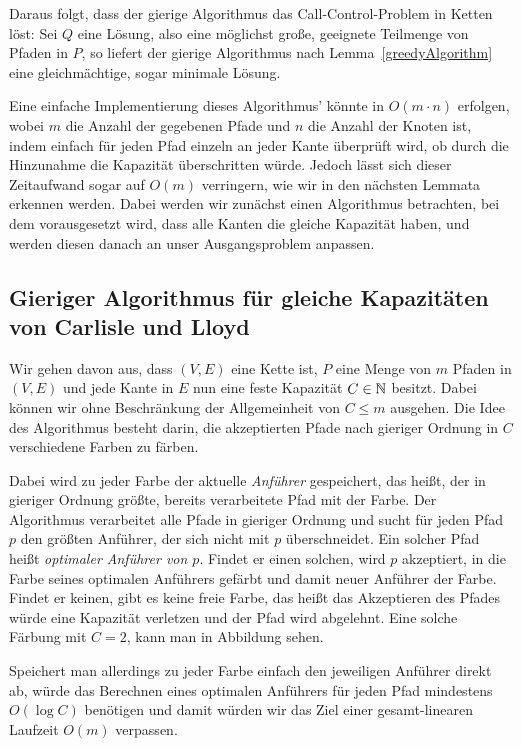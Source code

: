 Daraus folgt, dass der gierige Algorithmus das Call-Control-Problem in Ketten löst:
Sei $Q$ eine Lösung, also eine möglichst große, geeignete Teilmenge von Pfaden in $P$, so liefert der gierige
Algorithmus nach Lemma~\ref{greedyAlgorithm} eine gleichmächtige, sogar minimale Lösung.

Eine einfache Implementierung dieses Algorithmus' könnte in $O(m \cdot n)$ erfolgen, wobei $m$ die Anzahl der gegebenen
Pfade und $n$ die Anzahl der Knoten ist, indem einfach für jeden Pfad einzeln an jeder Kante überprüft wird, ob durch
die Hinzunahme die Kapazität überschritten würde.
Jedoch lässt sich dieser Zeitaufwand sogar auf $O(m)$ verringern, wie wir in den nächsten Lemmata 
erkennen werden.
Dabei werden wir zunächst einen Algorithmus betrachten, bei dem vorausgesetzt wird, dass alle Kanten die gleiche
Kapazität haben, und werden diesen danach an unser Ausgangsproblem anpassen.

\subsection{Gieriger Algorithmus für gleiche Kapazitäten von Carlisle und Lloyd}\label{subsec:algorithmusGleicheKapazitäten}
Wir gehen davon aus, dass $(V,E)$ eine Kette ist, $P$ eine Menge von $m$ Pfaden in $(V,E)$ und jede Kante in $E$ nun eine
feste Kapazität $C \in \mathbb N$ besitzt.
Dabei können wir ohne Beschränkung der Allgemeinheit von $C \leq m$ ausgehen.
Die Idee des Algorithmus besteht darin, die akzeptierten Pfade nach gieriger Ordnung in $C$ verschiedene Farben zu
färben.

Dabei wird zu jeder Farbe der aktuelle {\em Anführer} gespeichert, das heißt, der in gieriger Ordnung größte, bereits
verarbeitete Pfad mit der Farbe.
Der Algorithmus verarbeitet alle Pfade in gieriger Ordnung und sucht für jeden Pfad $p$ den größten Anführer, der
sich nicht mit $p$ überschneidet.
Ein solcher Pfad heißt {\em optimaler Anführer von $p$}.
Findet er einen solchen, wird $p$ akzeptiert, in die Farbe seines optimalen Anführers gefärbt und damit neuer Anführer
der Farbe.
Findet er keinen, gibt es keine freie Farbe, das heißt das Akzeptieren des Pfades würde eine Kapazität verletzen und der
Pfad wird abgelehnt.
Eine solche Färbung mit $C = 2$, kann man in Abbildung  sehen.


Speichert man allerdings zu jeder Farbe einfach den jeweiligen Anführer direkt ab, würde das Berechnen eines optimalen
Anführers für jeden Pfad mindestens $O(\log C)$ benötigen und damit würden wir das Ziel einer gesamt-linearen Laufzeit
$O(m)$ verpassen.

